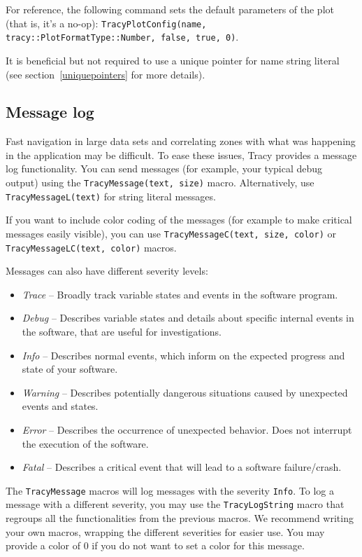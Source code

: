 \documentclass[hidelinks,titlepage,a4paper,twoside]{article}
\begin{document}
For reference, the following command sets the default parameters of the plot (that is, it's a no-op): \texttt{TracyPlotConfig(name, tracy::PlotFormatType::Number, false, true, 0)}.

It is beneficial but not required to use a unique pointer for name string literal (see section~\ref{uniquepointers} for more details).

\subsection{Message log}
\label{messagelog}

Fast navigation in large data sets and correlating zones with what was happening in the application may be difficult. To ease these issues, Tracy provides a message log functionality. You can send messages (for example, your typical debug output) using the \texttt{TracyMessage(text, size)} macro. Alternatively, use \texttt{TracyMessageL(text)} for string literal messages.

If you want to include color coding of the messages (for example to make critical messages easily visible), you can use \texttt{TracyMessageC(text, size, color)} or \texttt{TracyMessageLC(text, color)} macros.

Messages can also have different severity levels:

\begin{itemize}
\item \emph{Trace} -- Broadly track variable states and events in the software program.
\item \emph{Debug} -- Describes variable states and details about specific internal events in the software, that are useful for investigations.
\item \emph{Info} -- Describes normal events, which inform on the expected progress and state of your software.
\item \emph{Warning} -- Describes potentially dangerous situations caused by unexpected events and states.
\item \emph{Error} -- Describes the occurrence of unexpected behavior. Does not interrupt the execution of the software.
\item \emph{Fatal} -- Describes a critical event that will lead to a software failure/crash.
\end{itemize}

The \texttt{TracyMessage} macros will log messages with the severity \texttt{Info}. To log a message with a different severity, you may use the \texttt{TracyLogString} macro that regroups all the functionalities from the previous macros. We recommend writing your own macros, wrapping the different severities for easier use. You may provide a color of 0 if you do not want to set a color for this message.
\end{document}
